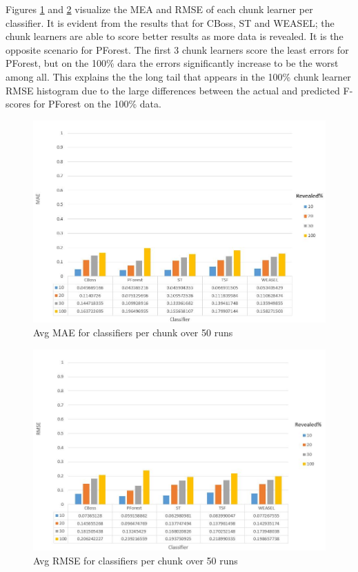 Figures \ref{Img:MAEClassifier} and \ref{Img:RMSEClassifier} visualize the MEA and RMSE of each chunk learner per classifier.
It is evident from the results that for CBoss, ST and WEASEL; the chunk learners are able to score better results as more data is revealed.
It is the opposite scenario for PForest. The first 3 chunk learners score the least errors for PForest, but on the 100\% dara the errors significantly increase to be the worst among all.
This explains the the long tail that appears in the 100\% chunk learner RMSE histogram due to the large differences between the actual and predicted F-scores for PForest on the 100\% data.

  \begin{figure}[!htbp]
    \captionsetup{justification=raggedright}
    \centering
    \includegraphics[width=\textwidth]{MAE_classifier.JPG}
    \centering
    \caption{Avg MAE for classifiers per chunk over 50 runs}
    \label{Img:MAEClassifier}
  \end{figure}

  \begin{figure}[!htbp]
    \captionsetup{justification=raggedright}
    \centering
    \includegraphics[width=\textwidth]{RMSE_classifier.JPG}
    \centering
    \caption{Avg RMSE for classifiers per chunk over 50 runs}
    \label{Img:RMSEClassifier}
  \end{figure}

